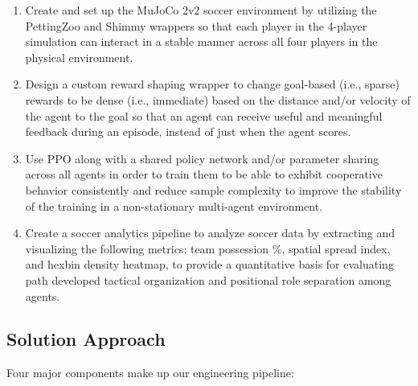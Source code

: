 \begin{enumerate}
    \item Create and set up the MuJoCo 2v2 soccer environment by utilizing the PettingZoo 
    and Shimmy wrappers so that each player in the 4-player simulation can interact in a 
    stable manner across all four players in the physical environment.

    \item Design a custom reward shaping wrapper to change goal-based (i.e., sparse) rewards 
    to be dense (i.e., immediate) based on the distance and/or velocity of the agent to the 
    goal so that an agent can receive useful and meaningful feedback during an episode, instead 
    of just when the agent scores.

    \item Use PPO along with a shared policy network and/or parameter sharing across all agents 
    in order to train them to be able to exhibit cooperative behavior consistently and reduce 
    sample complexity to improve the stability of the training in a non-stationary multi-agent 
    environment.

    \item Create a soccer analytics pipeline to analyze soccer data by extracting and 
    visualizing the following metrics: team possession \%, spatial spread index, and hexbin 
    density heatmap, to provide a quantitative basis for evaluating path developed tactical 
    organization and positional role separation among agents.
\end{enumerate}

\subsection{Solution Approach}
\label{sec:intro_sol}

Four major components make up our engineering pipeline:

